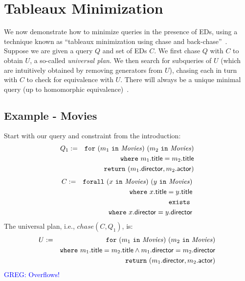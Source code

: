 \documentclass[preprint]{sigplanconf}
\newcommand{\FOR}{{\tt for} \ }
\newcommand{\FORALL}{{\tt forall} \ }
\newcommand{\EXISTS}{{\tt exists} \ }
\newcommand{\WHERE}{{\tt where} \ }
\newcommand{\IN}{ \ {\tt in} \ }
\newcommand{\RETURN}{{\tt return} \ }
\newcommand{\greg}[1]{\textcolor{blue}{GREG: #1}}
\newcommand{\relation}[1]{\ensuremath{\mathit{#1}}\xspace}
\begin{document}
\section{Tableaux Minimization}
\label{sec:minimize}

We now demonstrate how to minimize queries in the presence of EDs, using a technique known as ``tableaux minimization using chase and back-chase''~\cite{Deutsch:2006:QRC:1121995.1122010}.
Suppose we are given a query $Q$ and set of EDs $C$.
We first chase $Q$ with $C$ to obtain $U$, a so-called {\it universal plan}.
We then search for subqueries of $U$ (which are intuitively obtained by removing generators from $U$), chasing each in turn with $C$ to check for equivalence with $U$.
There will always be a unique minimal query (up to homomorphic equivalence)~\cite{Deutsch:2006:QRC:1121995.1122010}.

\subsection*{Example - Movies}
Start with our query and constraint from the introduction:
\begin{eqnarray*}
Q_1 & := & \FOR (m_1 \IN \relation{Movies}) \ (m_2 \IN \relation{Movies}) \\
 & & \WHERE m_1.{\sf title} = m_2.{\sf title} \\
 & & \RETURN (m_1.{\sf director}, m_2.{\sf actor})
\end{eqnarray*}
\begin{eqnarray*}
C & := & \FORALL (x \IN \relation{Movies}) \ (y \IN \relation{Movies}) \\
& & \WHERE x.{\sf title} = y.{\sf title} \\
& & \EXISTS \\
& & \WHERE x.{\sf director} = y.{\sf director}
\end{eqnarray*}
The universal plan, i.e., $chase(C,Q_1)$, is:
\begin{eqnarray*}
U & := & \FOR (m_1 \IN \relation{Movies}) \ (m_2 \IN \relation{Movies}) \\
 & & \WHERE m_1.{\sf title} = m_2.{\sf title} \wedge m_1.{\sf director} = m_2.{\sf 
director} \\
 & & \RETURN (m_1.{\sf director}, m_2.{\sf actor})
\end{eqnarray*}
\greg{Overflows!}
\end{document}
